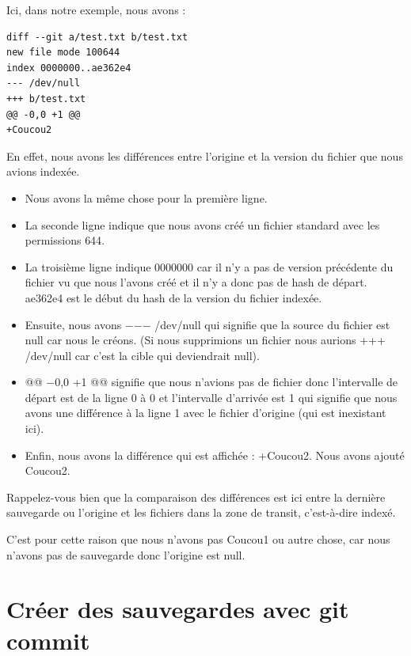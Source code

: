 \documentclass{article}
\begin{document}
Ici, dans notre exemple, nous avons :

\begin{verbatim}
diff --git a/test.txt b/test.txt
new file mode 100644
index 0000000..ae362e4
--- /dev/null
+++ b/test.txt
@@ -0,0 +1 @@
+Coucou2
\end{verbatim}

En effet, nous avons les différences entre l'origine et la version du fichier que nous avions indexée. 
\begin{itemize}
\item Nous avons la même chose pour la première ligne.

\item La seconde ligne indique que nous avons créé un fichier standard avec les permissions {\color{blue}644}.

\item La troisième ligne indique {\color{blue}0000000} car il n'y a pas de version précédente du fichier vu que nous l'avons créé et il n'y a donc pas de {\color{blue}hash} de départ. {\color{blue}ae362e4} est le début du {\color{blue}hash} de la version du fichier indexée.

\item Ensuite, nous avons {\color{blue}$-$$-$$-$ /dev/null} qui signifie que la source du fichier est {\color{blue}null} car nous le créons. (Si nous supprimions un fichier nous aurions {\color{blue}+++ /dev/null} car c'est la cible qui deviendrait {\color{blue}null}).

\item {\color{blue}@@ $-0$,0 +1 @@} signifie que nous n'avions pas de fichier donc l'intervalle de départ est de la ligne 0 à 0 et l'intervalle d'arrivée est {\color{blue}1} qui signifie que nous avons une différence à la ligne {\color{blue}1} avec le fichier d'origine (qui est inexistant ici).

\item Enfin, nous avons la différence qui est affichée : {\color{blue}+Coucou2}. Nous avons ajouté {\color{blue}Coucou2}.

\end{itemize}
Rappelez-vous bien que la comparaison des différences est ici entre la dernière sauvegarde ou l'origine et les fichiers dans la zone de transit, c'est-à-dire indexé.

C'est pour cette raison que nous n'avons pas {\color{blue}Coucou1} ou autre chose, car nous n'avons pas de sauvegarde donc l'origine est {\color{blue}null}.

\section{Créer des sauvegardes avec git commit}
\end{document}
